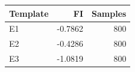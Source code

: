 \begin{longtable}{lrr}\toprule Template & FI & Samples\\\midrule\endhead
E1 & -0.7862 & 800\\
E2 & -0.4286 & 800\\
E3 & -1.0819 & 800\\
\bottomrule\end{longtable}
